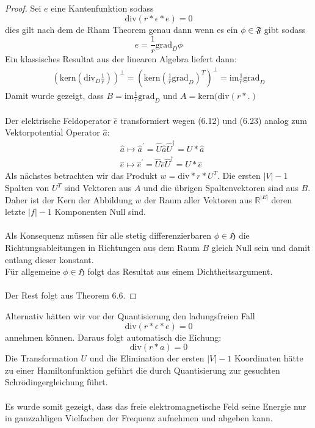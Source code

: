 \documentclass[11pt,a4paper,leqno]{report}
\numberwithin{equation}{chapter}
\begin{document}
\begin{proof}
	Sei $e$ eine Kantenfunktion sodass 
	\begin{equation*}
		\text{div}(r * \epsilon * e) = 0
	\end{equation*} dies gilt nach dem de Rham Theorem genau dann wenn es ein $\phi\in\mathfrak{F}$ gibt sodass 
\begin{equation*}
	e = \frac{1}{r}\text{grad}_D\phi
\end{equation*}
Ein klassisches Resultat aus der linearen Algebra liefert dann:
\begin{align*}
	 (\text{kern} (\text{div}_D\frac{1}{r}))^\perp 
	 =(\text{kern}(\frac{1}{r}\text{grad}_D)^T)^\perp =\text{im}\frac{1}{r}\text{grad}_D
\end{align*}
Damit wurde gezeigt, dass $B=\text{im}\frac{1}{r}\text{grad}_D$ und $A=\text{kern}(\text{div}(r*.)$\\
\\
Der elektrische Feldoperator $\hat{e}$ transformiert wegen (6.12) und (6.23) analog zum Vektorpotential Operator $\hat{a}$:
\begin{align}
	&\hat{a} \mapsto \hat{a}^{'} = \hat{U}\hat{a}\hat{U}^\dagger = U * \hat{a}\\
	&\hat{e} \mapsto \hat{e}^{'} = \hat{U}\hat{e}\hat{U}^\dagger = U * \hat{e}
\end{align}
Als n\"achstes betrachten wir das Produkt $w = \text{div} * r * U^T$.
Die ersten $|V| - 1$ Spalten von $U^T$ sind Vektoren aus $A$ und die \"ubrigen Spaltenvektoren sind aus $B$. Daher ist der Kern der Abbildung $w$ der Raum aller Vektoren aus $\mathbb{R}^{|E|}$ deren letzte $|f| - 1$ Komponenten Null sind.\\
\\
Als Konsequenz m\"ussen f\"ur alle stetig differenzierbaren $\phi\in\mathfrak{H}$ die Richtungsableitungen in Richtungen aus dem Raum $B$ gleich Null sein und damit entlang dieser konstant.\\
F\"ur allgemeine $\phi\in\mathfrak{H}$ folgt das Resultat aus einem Dichtheitsargument.\\
\\
Der Rest folgt aus Theorem 6.6.
\end{proof}
\noindent
Alternativ h\"atten wir vor der Quantisierung den ladungsfreien Fall
 \begin{equation}
 	\text{div}(r * \epsilon * e) = 0
 \end{equation}
 annehmen k\"onnen. Daraus folgt automatisch die Eichung:
 \begin{equation}
	\text{div}(r * a) = 0
\end{equation}
Die Transformation $U$ und die Elimination der ersten $|V| - 1$ Koordinaten h\"atte zu einer Hamiltonfunktion gef\"uhrt die durch Quantisierung zur gesuchten Schr\"odingergleichung f\"uhrt.\\
\\
Es wurde somit gezeigt, dass das freie elektromagnetische Feld seine Energie nur in ganzzahligen Vielfachen der Frequenz aufnehmen und abgeben kann. 
\end{document}
